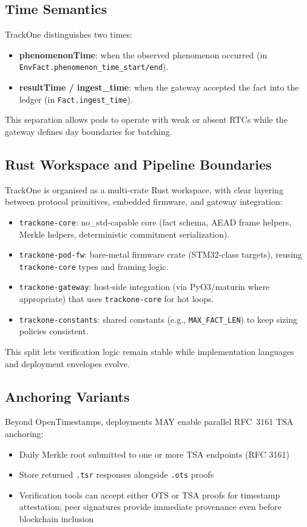 \subsection{Time Semantics}
\label{subsec:arch-time}

TrackOne distinguishes two times:
\begin{itemize}[nosep]
\item \textbf{phenomenonTime}: when the observed phenomenon occurred (in \texttt{EnvFact.phenomenon\_time\_start/end}).
\item \textbf{resultTime / ingest\_time}: when the gateway accepted the fact into the ledger (in \texttt{Fact.ingest\_time}).
\end{itemize}
This separation allows pods to operate with weak or absent RTCs while the gateway defines day boundaries for batching.

\subsection{Rust Workspace and Pipeline Boundaries}
\label{subsec:arch-rust-boundaries}

TrackOne is organised as a multi-crate Rust workspace, with clear layering between protocol primitives, embedded firmware, and gateway integration:
\begin{itemize}[nosep]
\item \texttt{trackone-core}: no\_std-capable core (fact schema, \ac{AEAD} frame helpers, Merkle helpers, deterministic commitment serialization).
\item \texttt{trackone-pod-fw}: bare-metal firmware crate (STM32-class targets), reusing \texttt{trackone-core} types and framing logic.
\item \texttt{trackone-gateway}: host-side integration (via PyO3/maturin where appropriate) that uses \texttt{trackone-core} for hot loops.
\item \texttt{trackone-constants}: shared constants (e.g., \texttt{MAX\_FACT\_LEN}) to keep sizing policies consistent.
\end{itemize}
This split lets verification logic remain stable while implementation languages and deployment envelopes evolve.

\subsection{Anchoring Variants}\label{subsec:anchoring-variants}
Beyond OpenTimestamps, deployments MAY enable parallel \ac{RFC}~3161 \ac{TSA} anchoring:
\begin{itemize}[nosep]
\item Daily Merkle root submitted to one or more \ac{TSA} endpoints (\ac{RFC} 3161)
\item Store returned \texttt{.tsr} responses alongside \texttt{.ots} proofs
\item Verification tools can accept either \ac{OTS} or \ac{TSA} proofs for timestamp attestation; peer signatures provide immediate provenance even before blockchain inclusion
\end{itemize}

